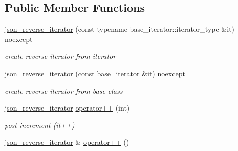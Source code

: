 \subsection*{Public Member Functions}
\begin{DoxyCompactItemize}
\item 
\hyperlink{classnlohmann_1_1detail_1_1json__reverse__iterator_a0246de16ece16293f2917dfa5d96e278}{json\+\_\+reverse\+\_\+iterator} (const typename base\+\_\+iterator\+::iterator\+\_\+type \&it) noexcept\hypertarget{classnlohmann_1_1detail_1_1json__reverse__iterator_a0246de16ece16293f2917dfa5d96e278}{}\label{classnlohmann_1_1detail_1_1json__reverse__iterator_a0246de16ece16293f2917dfa5d96e278}

\begin{DoxyCompactList}\small\item\em create reverse iterator from iterator \end{DoxyCompactList}\item 
\hyperlink{classnlohmann_1_1detail_1_1json__reverse__iterator_a6c2d025530114ed989188e8adfc8467e}{json\+\_\+reverse\+\_\+iterator} (const \hyperlink{classnlohmann_1_1detail_1_1json__reverse__iterator_a6b2ef1d632fe49bfcc22fbd1abd62395}{base\+\_\+iterator} \&it) noexcept\hypertarget{classnlohmann_1_1detail_1_1json__reverse__iterator_a6c2d025530114ed989188e8adfc8467e}{}\label{classnlohmann_1_1detail_1_1json__reverse__iterator_a6c2d025530114ed989188e8adfc8467e}

\begin{DoxyCompactList}\small\item\em create reverse iterator from base class \end{DoxyCompactList}\item 
\hyperlink{classnlohmann_1_1detail_1_1json__reverse__iterator}{json\+\_\+reverse\+\_\+iterator} \hyperlink{classnlohmann_1_1detail_1_1json__reverse__iterator_a7ec568b1d3e0827569a5bf1628ceae02}{operator++} (int)\hypertarget{classnlohmann_1_1detail_1_1json__reverse__iterator_a7ec568b1d3e0827569a5bf1628ceae02}{}\label{classnlohmann_1_1detail_1_1json__reverse__iterator_a7ec568b1d3e0827569a5bf1628ceae02}

\begin{DoxyCompactList}\small\item\em post-\/increment (it++) \end{DoxyCompactList}\item 
\hyperlink{classnlohmann_1_1detail_1_1json__reverse__iterator}{json\+\_\+reverse\+\_\+iterator} \& \hyperlink{classnlohmann_1_1detail_1_1json__reverse__iterator_a26caf0069a50ce4ecb010a1453e883fc}{operator++} ()\hypertarget{classnlohmann_1_1detail_1_1json__reverse__iterator_a26caf0069a50ce4ecb010a1453e883fc}{}\label{classnlohmann_1_1detail_1_1json__reverse__iterator_a26caf0069a50ce4ecb010a1453e883fc}


\end{DoxyCompactItemize}
